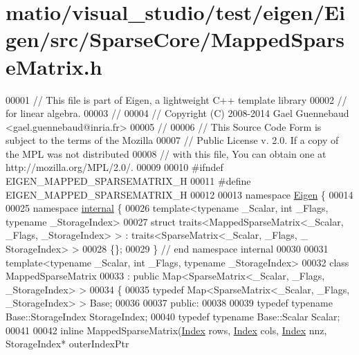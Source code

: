 \hypertarget{matio_2visual__studio_2test_2eigen_2_eigen_2src_2_sparse_core_2_mapped_sparse_matrix_8h_source}{}\section{matio/visual\+\_\+studio/test/eigen/\+Eigen/src/\+Sparse\+Core/\+Mapped\+Sparse\+Matrix.h}
\label{matio_2visual__studio_2test_2eigen_2_eigen_2src_2_sparse_core_2_mapped_sparse_matrix_8h_source}

\begin{DoxyCode}
00001 \textcolor{comment}{// This file is part of Eigen, a lightweight C++ template library}
00002 \textcolor{comment}{// for linear algebra.}
00003 \textcolor{comment}{//}
00004 \textcolor{comment}{// Copyright (C) 2008-2014 Gael Guennebaud <gael.guennebaud@inria.fr>}
00005 \textcolor{comment}{//}
00006 \textcolor{comment}{// This Source Code Form is subject to the terms of the Mozilla}
00007 \textcolor{comment}{// Public License v. 2.0. If a copy of the MPL was not distributed}
00008 \textcolor{comment}{// with this file, You can obtain one at http://mozilla.org/MPL/2.0/.}
00009 
00010 \textcolor{preprocessor}{#ifndef EIGEN\_MAPPED\_SPARSEMATRIX\_H}
00011 \textcolor{preprocessor}{#define EIGEN\_MAPPED\_SPARSEMATRIX\_H}
00012 
00013 \textcolor{keyword}{namespace }\hyperlink{namespace_eigen}{Eigen} \{
00014 
00025 \textcolor{keyword}{namespace }\hyperlink{namespaceinternal}{internal} \{
00026 \textcolor{keyword}{template}<\textcolor{keyword}{typename} \_Scalar, \textcolor{keywordtype}{int} \_Flags, \textcolor{keyword}{typename} \_StorageIndex>
00027 \textcolor{keyword}{struct }traits<MappedSparseMatrix<\_Scalar, \_Flags, \_StorageIndex> > : traits<SparseMatrix<\_Scalar, \_Flags, \_
      StorageIndex> >
00028 \{\};
00029 \} \textcolor{comment}{// end namespace internal}
00030 
00031 \textcolor{keyword}{template}<\textcolor{keyword}{typename} \_Scalar, \textcolor{keywordtype}{int} \_Flags, \textcolor{keyword}{typename} \_StorageIndex>
00032 \textcolor{keyword}{class }MappedSparseMatrix
00033   : \textcolor{keyword}{public} Map<SparseMatrix<\_Scalar, \_Flags, \_StorageIndex> >
00034 \{
00035     \textcolor{keyword}{typedef} Map<SparseMatrix<\_Scalar, \_Flags, \_StorageIndex> > Base;
00036 
00037   \textcolor{keyword}{public}:
00038     
00039     \textcolor{keyword}{typedef} \textcolor{keyword}{typename} Base::StorageIndex StorageIndex;
00040     \textcolor{keyword}{typedef} \textcolor{keyword}{typename} Base::Scalar Scalar;
00041 
00042     \textcolor{keyword}{inline} MappedSparseMatrix(\hyperlink{namespace_eigen_a62e77e0933482dafde8fe197d9a2cfde}{Index} rows, \hyperlink{namespace_eigen_a62e77e0933482dafde8fe197d9a2cfde}{Index} cols, \hyperlink{namespace_eigen_a62e77e0933482dafde8fe197d9a2cfde}{Index} nnz, StorageIndex* outerIndexPtr

\end{DoxyCode}
